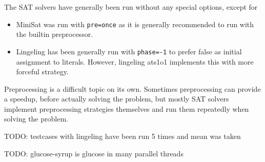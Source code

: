 The SAT solvers have generally been run without any special options, except for
\begin{itemize}
  \item MiniSat was run with \texttt{\textendash{}\textendash{}pre=once} as it is generally recommended to run with the builtin preprocessor.
  \item Lingeling has been generally run with \texttt{\textendash{}\textendash{}phase=-1} to prefer false as initial assignment to literals.
    However, lingeling ats1o1 implements this with more forceful strategy.
\end{itemize}

Preprocessing is a difficult topic on its own. Sometimes preprocessing can provide a speedup,
before actually solving the problem, but mostly SAT solvers implement preprocessing strategies
themselves and run them repeatedly when solving the problem.

TODO: testcases with lingeling have been run 5 times and mean was taken

TODO: glucose-syrup is glucose in many parallel threads
